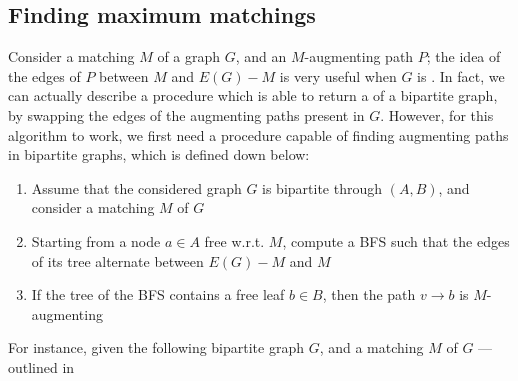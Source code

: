 \documentclass[a4paper, 12pt]{report}
\begin{document}
    \subsection{Finding maximum matchings}

    Consider a matching $M$ of a graph $G$, and an $M$-augmenting path $P$; the idea of  the edges of $P$ between $M$ and $E(G) - M$ is very useful when $G$ is . In fact, we can actually describe a procedure which is able to return a  of a bipartite graph, by swapping the edges of the augmenting paths present in $G$. However, for this algorithm to work, we first need a procedure capable of finding augmenting paths in bipartite graphs, which is defined down below:

    \begin{enumerate}
        \item Assume that the considered graph $G$ is bipartite through $(A, B)$, and consider a matching $M$ of $G$
        \item Starting from a node $a \in A$ free w.r.t. $M$, compute a  BFS such that the edges of its tree alternate between $E(G) - M$ and $M$
        \item If the tree of the BFS contains a free leaf $b \in B$, then the path $v \to b$ is $M$-augmenting
    \end{enumerate}

    For instance, given the following bipartite graph $G$, and a matching $M$ of $G$ --- outlined in 

    \begin{figure}[H]
        \centering
    \end{figure}
\end{document}
